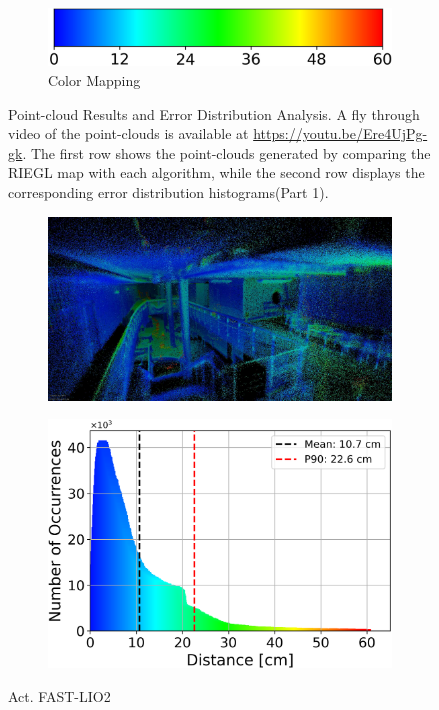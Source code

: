 \documentclass[english, bachelor, utf8]{base/thesis_telematics}
\begin{document}
\begin{figure}
\begin{subfigure}{0.3\textwidth}
    \centering
    \includegraphics[width=\textwidth]{pics/histogram_results/hsv.png}
    \caption{Color Mapping}
    \label{fig:hsv}
\end{subfigure}
\caption{Point-cloud Results and Error Distribution Analysis. A fly through video of the point-clouds is available at \url{https://youtu.be/Ere4UjPg-gk}. 
The first row shows the point-clouds generated by comparing the RIEGL map with each algorithm, while the second row displays the corresponding error distribution histograms(Part 1).}
\label{fig:combined_results1}
\end{figure}

\begin{figure}
    \centering
\begin{subfigure}{0.45\textwidth}
    \centering
    \includegraphics[width=\textwidth]{pics/results_images/a_lio.jpg}
    \label{fig:results_act_lio}
\end{subfigure}

\begin{subfigure}{0.45\textwidth}
    \centering
    \includegraphics[width=\textwidth]{pics/histogram_results/histogram_cond_actuated_lio.png}
    \label{fig:hist_act_lio}
\end{subfigure}
\label{fig:combined_results2}
\caption{Act. FAST-LIO2}
\end{figure}
\end{document}
